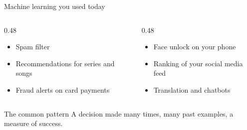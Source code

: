 \documentclass[handout,aspectratio=169,t,9pt]{beamer}
\begin{document}
\begin{frame}{Machine learning you used today}
  \begin{columns}[T,onlytextwidth]
    \begin{column}{0.48\textwidth}
      \begin{itemize}
        \item Spam filter
        \item Recommendations for series and songs
        \item Fraud alerts on card payments
      \end{itemize}
    \end{column}
    \begin{column}{0.48\textwidth}
      \begin{itemize}
        \item Face unlock on your phone
        \item Ranking of your social media feed
        \item Translation and chatbots
      \end{itemize}
    \end{column}
  \end{columns}

  \vfill
  \begin{keypoint}{The common pattern}
    A decision made many times, many past examples, a measure of success.
  \end{keypoint}

\end{frame}
\end{document}

